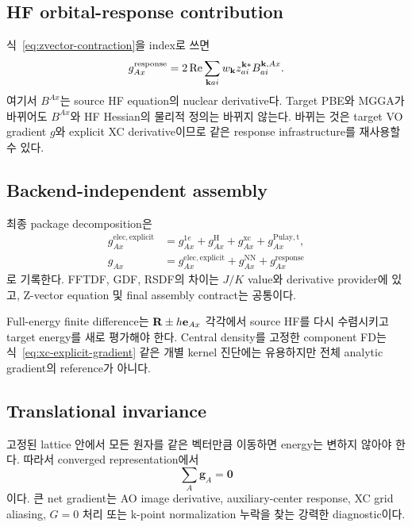 \subsection{HF orbital-response contribution}

식~\eqref{eq:zvector-contraction}을 index로 쓰면
\begin{equation}
  g_{Ax}^{\mathrm{response}}
  =2\operatorname{Re}\sum_{\mathbf{k} ai}w_{\mathbf{k}}
   z_{ai}^{\mathbf{k} *}B_{ai}^{\mathbf{k},Ax}.
  \label{eq:response-gradient}
\end{equation}
여기서 $B^{Ax}$는 source HF equation의 nuclear derivative다. Target PBE와 MGGA가
바뀌어도 $B^{Ax}$와 HF Hessian의 물리적 정의는 바뀌지 않는다. 바뀌는 것은 target
VO gradient $g$와 explicit XC derivative이므로 같은 response infrastructure를 재사용할
수 있다.

\subsection{Backend-independent assembly}

최종 package decomposition은
\begin{align}
  g_{Ax}^{\mathrm{elec,explicit}}
  &=g_{Ax}^{1e}+g_{Ax}^{\mathrm H}+g_{Ax}^{\mathrm{xc}}
    +g_{Ax}^{\mathrm{Pulay,t}},\\
  g_{Ax}
  &=g_{Ax}^{\mathrm{elec,explicit}}
    +g_{Ax}^{\mathrm{NN}}+g_{Ax}^{\mathrm{response}}
  \label{eq:final-gradient-assembly}
\end{align}
로 기록한다. FFTDF, GDF, RSDF의 차이는 $J/K$ value와 derivative provider에 있고,
Z-vector equation 및 final assembly contract는 공통이다.

\begin{remark}
Full-energy finite difference는 $\mathbf{R}\pm h\mathbf e_{Ax}$ 각각에서 source HF를 다시
수렴시키고 target energy를 새로 평가해야 한다. Central density를 고정한 component FD는
식~\eqref{eq:xc-explicit-gradient} 같은 개별 kernel 진단에는 유용하지만 전체 analytic
gradient의 reference가 아니다.
\end{remark}

\subsection{Translational invariance}

고정된 lattice 안에서 모든 원자를 같은 벡터만큼 이동하면 energy는 변하지 않아야 한다.
따라서 converged representation에서
\begin{equation}
  \sum_A\mathbf g_A=\mathbf0
  \label{eq:translation-sum-rule}
\end{equation}
이다. 큰 net gradient는 AO image derivative, auxiliary-center response, XC grid aliasing,
$G=0$ 처리 또는 k-point normalization 누락을 찾는 강력한 diagnostic이다.
